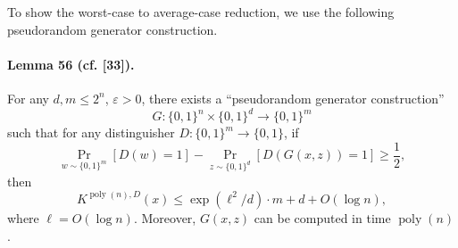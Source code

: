To show the worst-case to average-case reduction, we use the following pseudorandom generator construction.
\paragraph{Lemma 56 (cf. [33]).} For any $d,m\leq2^n$, $\varepsilon>0$, there exists a ``pseudorandom generator construction''
\[G:\{0,1\}^n\times\{0,1\}^d\to\{0,1\}^m\]
such that for any distinguisher $D:\{0,1\}^m\to\{0,1\}$, if
\[\Pr_{w\sim\{0,1\}^m}[D(w)=1]-\Pr_{z\sim\{0,1\}^d}[D(G(x,z))=1]\geq\frac12,\]
then
\[K^{\operatorname{poly}(n),D}(x)\leq\exp(\ell^2/d)\cdot m+d+O(\log n),\]
where $\ell=O(\log n)$. Moreover, $G(x,z)$ can be computed in time $\operatorname{poly}(n)$.
